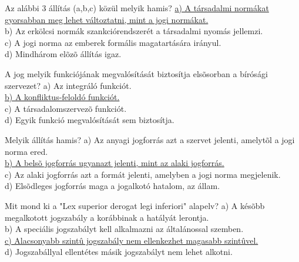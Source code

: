 \begin{frame}

\begin{tcolorbox}[title={5. Kérdés}]
Az alábbi 3 állítás (a,b,c) közül melyik hamis?
\tcblower
\uline {a) A társadalmi normákat gyorsabban meg lehet változtatni, mint a jogi normákat.}\\
b) Az erkölcsi normák szankciórendszerét a társadalmi nyomás jellemzi.\\
c) A jogi norma az emberek formális magatartására irányul.\\
d) Mindhárom elõzõ állítás igaz.
\end{tcolorbox}

\begin{tcolorbox}[title={6. Kérdés}]
A jog melyik funkciójának megvalósítását biztosítja elsõsorban a bírósági szervezet?
\tcblower
a) Az integráló funkciót.\\
\uline {b) A konfliktus-feloldó funkciót.}\\
c) A társadalomszervezõ funkciót.\\
d) Egyik funkció megvalósítását sem biztosítja.
\end{tcolorbox}

\begin{tcolorbox}[title={7. Kérdés}]
Melyik állítás hamis?
\tcblower
a) Az anyagi jogforrás azt a szervet jelenti, amelytõl a jogi norma ered.\\
\uline {b) A belsõ jogforrás ugyanazt jelenti, mint az alaki jogforrás.}\\
c) Az alaki jogforrás azt a formát jelenti, amelyben a jogi norma megjelenik.\\
d) Elsõdleges jogforrás maga a jogalkotó hatalom, az állam. 
\end{tcolorbox}

\begin{tcolorbox}[title={8. Kérdés}]
Mit mond ki a "Lex superior derogat legi inferiori" alapelv?
\tcblower
a) A késõbb megalkotott jogszabály a korábbinak a hatályát lerontja.\\
b) A speciális jogszabályt kell alkalmazni az általánossal szemben.\\
\uline {c) Alacsonyabb szintû jogszabály nem ellenkezhet magasabb szintûvel.}\\
d) Jogszabállyal ellentétes másik jogszabályt nem lehet alkotni.
\end{tcolorbox}

\end{frame}


